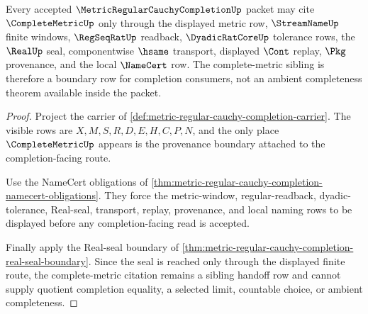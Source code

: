\begin{theorem}
\label{thm:metric-regular-cauchy-completion-complete-metric-handoff}
Every accepted $\MetricRegularCauchyCompletionUp$ packet may cite $\CompleteMetricUp$ only through the displayed metric row, $\StreamNameUp$ finite windows, $\RegSeqRatUp$ readback, $\DyadicRatCoreUp$ tolerance rows, the $\RealUp$ seal, componentwise $\hsame$ transport, displayed $\Cont$ replay, $\Pkg$ provenance, and the local $\NameCert$ row. The complete-metric sibling is therefore a boundary row for completion consumers, not an ambient completeness theorem available inside the packet.
\end{theorem}
\begin{proof}
Project the carrier of \autoref{def:metric-regular-cauchy-completion-carrier}. The visible rows are $X,M,S,R,D,E,H,C,P,N$, and the only place $\CompleteMetricUp$ appears is the provenance boundary attached to the completion-facing route.

Use the NameCert obligations of \autoref{thm:metric-regular-cauchy-completion-namecert-obligations}. They force the metric-window, regular-readback, dyadic-tolerance, Real-seal, transport, replay, provenance, and local naming rows to be displayed before any completion-facing read is accepted.

Finally apply the Real-seal boundary of \autoref{thm:metric-regular-cauchy-completion-real-seal-boundary}. Since the seal is reached only through the displayed finite route, the complete-metric citation remains a sibling handoff row and cannot supply quotient completion equality, a selected limit, countable choice, or ambient completeness.
\end{proof}

